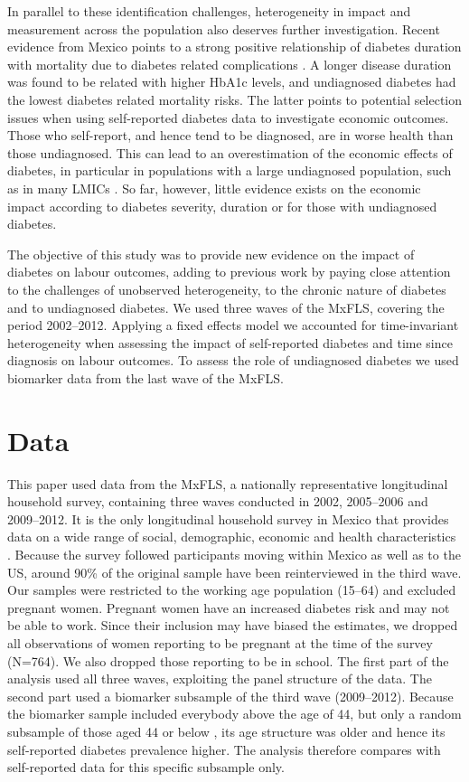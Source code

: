 \documentclass[12pt,english]{article}
\begin{document}
In parallel to these identification challenges, heterogeneity in impact and measurement across the population also deserves further investigation. Recent evidence from Mexico points to a strong positive relationship of diabetes duration with mortality due to diabetes related complications \parencite{Herrington2018}. A longer disease duration was found to be related with higher \ac{HbA1c} levels, and undiagnosed diabetes had the lowest diabetes related mortality risks. The latter points to potential selection issues when using self-reported diabetes data to investigate economic outcomes. Those who self-report, and hence tend to be diagnosed, are in worse health than those undiagnosed. This can lead to an overestimation of the economic effects of diabetes, in particular in populations with a large undiagnosed population, such as in many \acp{LMIC} \parencite{Beagley2014}. So far, however, little evidence exists on the economic impact according to diabetes severity, duration or for those with undiagnosed diabetes. 

The objective of this study was to provide new evidence on the impact of diabetes on labour outcomes, adding to previous work by paying close attention to the challenges of unobserved heterogeneity, to the chronic nature of diabetes and to undiagnosed diabetes. We used three waves of the \ac{MxFLS}, covering the period 2002--2012. Applying a fixed effects model we accounted for time-invariant heterogeneity when assessing the impact of self-reported diabetes and time since diagnosis on labour outcomes. To assess the role of undiagnosed diabetes we used biomarker data from the last wave of the \ac{MxFLS}.

\section{\label{sec:Data}Data}

This paper used data from the \acf{MxFLS}, a nationally representative longitudinal household survey, containing three waves conducted in 2002, 2005--2006 and 2009--2012. It is the only longitudinal household survey in Mexico that provides data on a wide range of social, demographic, economic and health characteristics \parencite{Rubalcava2013}. Because the survey followed participants moving within Mexico as well as to the US, around 90\% of the original sample have been reinterviewed in the third wave. Our samples were restricted to the working age population (15--64) and excluded pregnant women. Pregnant women have an increased diabetes risk and may not be able to work. Since their inclusion may have biased the estimates, we dropped all observations of women reporting to be pregnant at the time of the survey (N=764). We also dropped those reporting to be in school. The first part of the analysis used all three waves, exploiting the panel structure of the data. The second part used a biomarker subsample of the third wave (2009--2012). Because the biomarker sample included everybody above the age of 44, but only a random subsample of those aged 44 or below \parencite{Crimmins2015}, its age structure was older and hence its self-reported diabetes prevalence higher. The analysis therefore compares with self-reported data for this specific subsample only.
\end{document}
